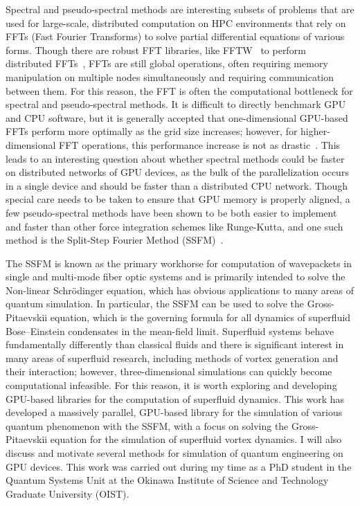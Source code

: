 Spectral and pseudo-spectral methods are interesting subsets of problems that are used for large-scale, distributed computation on HPC environments that rely on FFTs (Fast Fourier Transforms) to solve partial differential equations of various forms.
Though there are robust FFT libraries, like FFTW~\cite{frigo1998} to perform distributed FFTs~\cite{popovici2018}, FFTs are still global operations, often requiring memory manipulation on multiple nodes simultaneously and requiring communication between them.
For this reason, the FFT is often the computational bottleneck for spectral and pseudo-spectral methods.
It is difficult to directly benchmark GPU and CPU software, but it is generally accepted that one-dimensional GPU-based FFTs perform more optimally as the grid size increases; however, for higher-dimensional FFT operations, this performance increase is not as drastic~\cite{merz2016}.
This leads to an interesting question about whether spectral methods could be faster on distributed networks of GPU devices, as the bulk of the parallelization occurs in a single device and should be faster than a distributed CPU network.
Though special care needs to be taken to ensure that GPU memory is properly aligned, a few pseudo-spectral methods have been shown to be both easier to implement and faster than other force integration schemes like Runge-Kutta, and one such method is the Split-Step Fourier Method (SSFM)~\cite{brehler2017}.

The SSFM is known as the primary workhorse for computation of wavepackets in single and multi-mode fiber optic systems and is primarily intended to solve the Non-linear Schr\"odinger equation, which has obvious applications to many areas of quantum simulation.
In particular, the SSFM can be used to solve the Gross-Pitaevskii equation, which is the governing formula for all dynamics of superfluid Bose--Einstein condensates in the mean-field limit.
Superfluid systems behave fundamentally differently than classical fluids and there is significant interest in many areas of superfluid research, including methods of vortex generation and their interaction; however, three-dimensional simulations can quickly become computational infeasible.
For this reason, it is worth exploring and developing GPU-based libraries for the computation of superfluid dynamics.
This work has developed a massively parallel, GPU-based library for the simulation of various quantum phenomenon with the SSFM, with a focus on solving the Gross-Pitaevskii equation for the simulation of superfluid vortex dynamics.
I will also discuss and motivate several methods for simulation of quantum engineering on GPU devices.
This work was carried out during my time as a PhD student in the Quantum Systems Unit at the Okinawa Institute of Science and Technology Graduate University (OIST).

